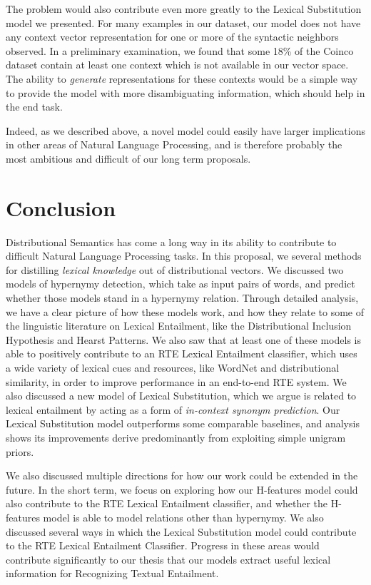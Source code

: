 \documentclass[12pt]{article}
\begin{document}
The problem would also contribute even more greatly to the Lexical Substitution
model we presented. For many examples in our dataset, our model does not have
any context vector representation for one or more of the syntactic neighbors
observed. In a preliminary examination, we found that some 18\% of the Coinco
dataset contain at least one context which is not available in our vector space.
The ability to {\em generate} representations for these contexts would be
a simple way to provide the model with more disambiguating information, which
should help in the end task.

Indeed, as we described above, a novel model could easily have larger
implications in other areas of Natural Language Processing, and is therefore
probably the most ambitious and difficult of our long term proposals.

\pagebreak
\section{Conclusion}

Distributional Semantics has come a long way in its ability to contribute to
difficult Natural Language Processing tasks. In this proposal, we several
methods for distilling {\em lexical knowledge} out of distributional vectors.
We discussed two models of hypernymy detection, which take as input pairs of
words, and predict whether those models stand in a hypernymy relation.  Through
detailed analysis, we have a clear picture of how these models work, and how
they relate to some of the linguistic literature on Lexical Entailment, like
the Distributional Inclusion Hypothesis and Hearst Patterns. We also saw that
at least one of these models is able to positively contribute to an RTE Lexical
Entailment classifier, which uses a wide variety of lexical cues and resources,
like WordNet and distributional similarity, in order to improve performance in
an end-to-end RTE system. We also discussed a new model of Lexical
Substitution, which we argue is related to lexical entailment by acting as a
form of {\em in-context synonym prediction}. Our Lexical Substitution model
outperforms some comparable baselines, and analysis shows its improvements
derive predominantly from exploiting simple unigram priors.

We also discussed multiple directions for how our work could be extended
in the future. In the short term, we focus on exploring how our H-features
model could also contribute to the RTE Lexical Entailment classifier, and
whether the H-features model is able to model relations other than hypernymy.
We also discussed several ways in which the Lexical Substitution model could
contribute to the RTE Lexical Entailment Classifier. Progress in these areas
would contribute significantly to our thesis that our models extract useful
lexical information for Recognizing Textual Entailment.
\end{document}
